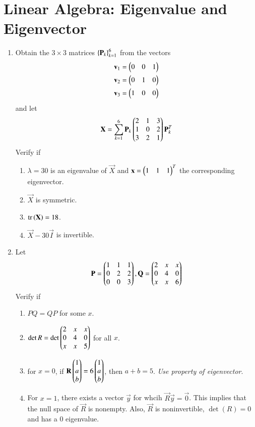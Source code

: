 \documentclass[journal,12pt,twocolumn]{IEEEtran}
\renewcommand\thesection{\arabic{section}}
\begin{document}
\section{Linear Algebra: Eigenvalue and Eigenvector}
\begin{enumerate}[label=\thesection.\arabic*
,ref=\thesection.\theenumi]
\item Obtain the  $3 \times 3$ matrices $\left\{\mathbf{P}_k\right\}_{k=1}^{6}$ from the vectors
\begin{align}
\mathbf{v}_1 = \begin{pmatrix}0 & 0 & 1\end{pmatrix}
\\
\mathbf{v}_2 = \begin{pmatrix}0 & 1 & 0\end{pmatrix}
\\
\mathbf{v}_3 = \begin{pmatrix}1 & 0 & 0\end{pmatrix}
\end{align}
%
and  let 
\begin{align}
\mathbf{X} = \sum_{k=1}^{6}\mathbf{P}_k\begin{pmatrix}2 & 1 & 3 \\ 1 & 0 & 2 \\ 3 & 2 & 1\end{pmatrix}\mathbf{P}_k^T
\end{align}
%
Verify if 
\begin{enumerate}
\item $\lambda = 30$ is an eigenvalue of $\vec{X}$ and  $\mathbf{x} = \begin{pmatrix}1 & 1 & 1\end{pmatrix}^T$ the corresponding eigenvector.
\item $\vec{X}$ is symmetric.
\item $\text{tr}\left(\mathbf{X}\right) = 18$.
\item $\vec{X}-30\vec{I}$ is invertible.
\end{enumerate}
\item Let 
\begin{align}
\mathbf{P} = \begin{pmatrix}1 & 1 & 1 \\ 0 & 2 & 2 \\ 0 & 0 & 3\end{pmatrix}, 
\mathbf{Q} = \begin{pmatrix}2 & x & x \\ 0 & 4 & 0 \\ x & x & 6\end{pmatrix}
\end{align}
Verify if 
\begin{enumerate}
\item $PQ=QP$ for some $x$.
\item 
$
\det{R}= 
\det\begin{pmatrix}2 & x & x \\ 0 & 4 & 0 \\ x & x & 5\end{pmatrix}
$ 
for all $x$.
\item for $x= 0$, if $\mathbf{R}\begin{pmatrix}1 \\ a \\ b\end{pmatrix} = 6\begin{pmatrix}1 \\ a \\ b\end{pmatrix}$, then $a+b = 5$. {\em Use property of eigenvector}.
\item For $x = 1$, there exists a  vector $\vec{y}$ for whcih $\vec{R}\vec{y} = \vec{0}$. This implies that the null space of $\vec{R}$ is nonempty. Also, $\vec{R}$ is noninvertible, $\det(R)=0$ and has a 0 eigenvalue.


\end{enumerate}
\end{enumerate}
\end{document}
